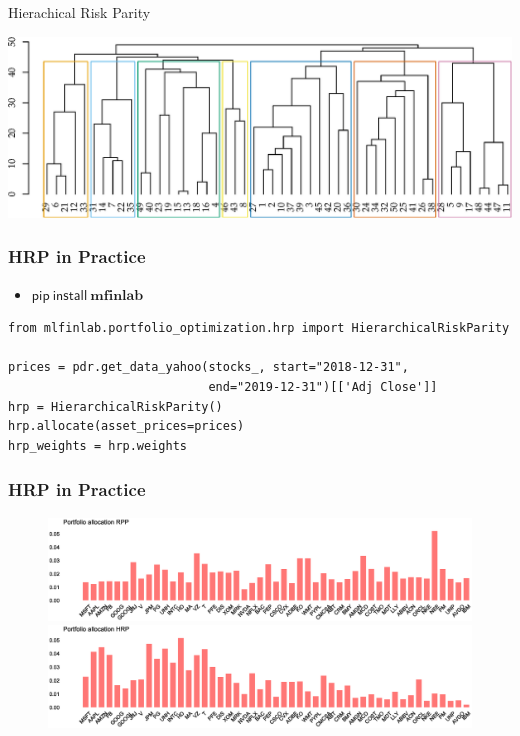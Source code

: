 \documentclass[aspectratio=169]{beamer}
\begin{document}
\begin{frame}{Hierachical Risk Parity}
  \begin{center}
  \includegraphics[scale=.65]{images/dendogram-original.eps}
  \end{center}
\end{frame}

\begin{frame}[fragile]
  \frametitle{HRP in Practice}
  \begin{itemize}
    \item $\mathsf{pip~install~\textbf{mfinlab}}$
\end{itemize}

\begin{verbatim}
from mlfinlab.portfolio_optimization.hrp import HierarchicalRiskParity

prices = pdr.get_data_yahoo(stocks_, start="2018-12-31",
                            end="2019-12-31")[['Adj Close']]
hrp = HierarchicalRiskParity()
hrp.allocate(asset_prices=prices)
hrp_weights = hrp.weights
\end{verbatim}
\end{frame}

\begin{frame}
  \frametitle{HRP in Practice}
  \begin{figure}
  \pause
    \includegraphics[scale=.5]{images/rpp_allocation.eps}
  \pause
    \includegraphics[scale=.5]{images/hrp_allocation.eps}
  \end{figure}
\end{frame}
\end{document}
